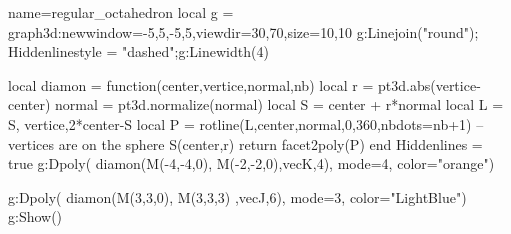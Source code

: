 \documentclass[12pt]{standalone}
\begin{document}
\begin{luadraw}{name=regular_octahedron}
local g = graph3d:new{window={-5,5,-5,5},viewdir={30,70},size={10,10}}
g:Linejoin("round"); Hiddenlinestyle = "dashed";g:Linewidth(4)

local diamon = function(center,vertice,normal,nb)
    local r = pt3d.abs(vertice-center)
    normal = pt3d.normalize(normal)
    local S = center + r*normal
    local L = {S, vertice,2*center-S}
    local P = rotline(L,{center,normal},0,360,{nbdots=nb+1}) -- vertices are on the sphere S(center,r)
    return facet2poly(P)
end
Hiddenlines = true
g:Dpoly( diamon(M(-4,-4,0), M(-2,-2,0),vecK,4), {mode=4, color="orange"})

g:Dpoly( diamon(M(3,3,0), M(3,3,3) ,vecJ,6), {mode=3, color="LightBlue"})
g:Show()
\end{luadraw}
\end{document}
